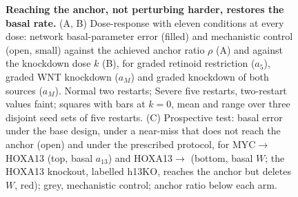 \begin{figure}[tbp]
\centering
{}
\caption{\textbf{Reaching the anchor, not perturbing harder, restores the basal
rate.} (A, B) Dose-response with eleven conditions at every dose: network
basal-parameter error (filled) and mechanistic control (open, small) against
the achieved anchor ratio $\rho$ (A) and against the knockdown dose $k$ (B), for
graded retinoid restriction ($a_5$), graded WNT knockdown ($a_M$) and graded
knockdown of both \bcat{} sources ($a_M$). Normal two restarts; Severe five
restarts, two-restart values faint; squares with bars at $k=0$, mean and range
over three disjoint seed sets of five restarts. (C) Prospective test: basal
error under the base design, under a near-miss that does not reach the anchor
(open) and under the prescribed protocol, for MYC$\to$HOXA13 (top, basal
$a_{13}$) and HOXA13$\to$\bcat{} (bottom, basal $W$; the HOXA13 knockout,
labelled h13KO, reaches the anchor but deletes $W$, red); grey, mechanistic
control; anchor ratio below each arm.}
\label{fig:dose}
\end{figure}
